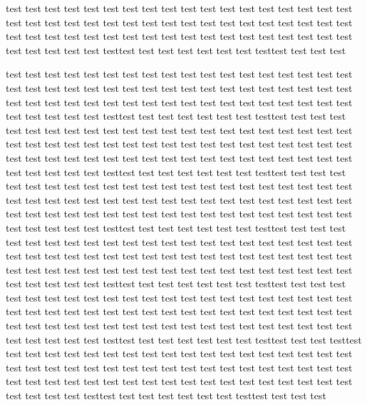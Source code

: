 test test test test test test test test test test test test test test test test test test test test test test test test test test test test test test test test test test test test test test test test test test test test test test test test test test test test test test test test test test test testtest test test test test test test testtest test test test


test test test test test test test test test test test test test test test test test test test test test test test test test test test test test test test test test test test test test test test test test test test test test test test test test test test test test test test test test test test testtest test test test test test test testtest test test test
test test test test test test test test test test test test test test test test test test test test test test test test test test test test test test test test test test test test test test test test test test test test test test test test test test test test test test test test test test test testtest test test test test test test testtest test test test
test test test test test test test test test test test test test test test test test test test test test test test test test test test test test test test test test test test test test test test test test test test test test test test test test test test test test test test test test test test testtest test test test test test test testtest test test test
test test test test test test test test test test test test test test test test test test test test test test test test test test test test test test test test test test test test test test test test test test test test test test test test test test test test test test test test test test test testtest test test test test test test testtest test test test
test test test test test test test test test test test test test test test test test test test test test test test test test test test test test test test test test test test test test test test test test test test test test test test test test test test test test test test test test test test testtest test test test test test test testtest test test testtest test test test test test test test test test test test test test test test test test test test test test test test test test test test test test test test test test test test test test test test test test test test test test test test test test test test test test test test test test test testtest test test test test test test testtest test test test
